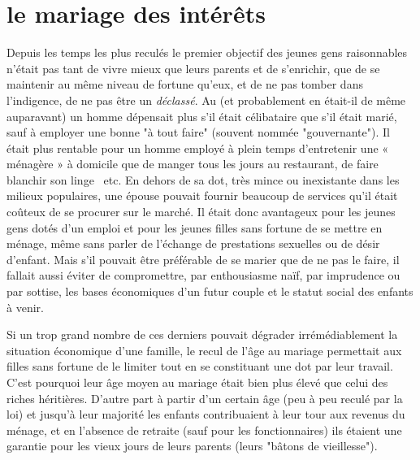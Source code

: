 \section{le mariage des intérêts}
 
 Depuis les temps les plus reculés le premier objectif des jeunes gens raisonnables n'était pas tant de vivre mieux que leurs parents et de s'enrichir, que de se maintenir au même niveau de fortune qu'eux, et de ne pas tomber dans l'indigence, de ne pas être un \emph{déclassé}. Au  (et probablement en était-il de même auparavant) un homme dépensait plus s'il était célibataire que s'il était marié, sauf à employer une bonne "à tout faire" (souvent nommée "gouvernante"). Il était plus rentable pour un homme employé à plein temps d'entretenir une « ménagère » à domicile que de manger tous les jours au restaurant, de faire blanchir son linge ~etc. En dehors de sa dot, très mince ou inexistante dans les milieux populaires, une épouse pouvait fournir beaucoup de services qu'il était coûteux de se procurer sur le marché. Il était donc avantageux pour les jeunes gens dotés d'un emploi et pour les jeunes filles sans fortune de se mettre en ménage, même sans parler de l'échange de prestations sexuelles ou de désir d'enfant. Mais s'il pouvait être préférable de se marier que de ne pas le faire, il fallait aussi éviter de compromettre, par enthousiasme naïf, par imprudence ou par sottise, les bases économiques d'un futur couple et le statut social des enfants à venir. 
 
 Si un trop grand nombre de ces derniers pouvait dégrader irrémédiablement la situation économique d'une famille, le recul de l'âge au mariage permettait aux filles sans fortune de le limiter tout en se constituant une dot par leur travail. C'est pourquoi leur âge moyen au mariage était bien plus élevé que celui des riches héritières. D'autre part à partir d'un certain âge (peu à peu reculé par la loi) et jusqu'à leur majorité les enfants contribuaient à leur tour aux revenus du ménage, et en l'absence de retraite (sauf pour les fonctionnaires) ils étaient une garantie pour les vieux jours de leurs parents (leurs "bâtons de vieillesse"). 

